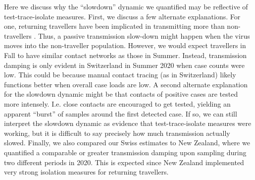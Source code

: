 \documentclass[9pt,twoside,lineno]{pnas-new} %
\begin{document}
Here we discuss why the ``slowdown'' dynamic we quantified may be reflective of test-trace-isolate measures. First, we discuss a few alternate explanations. For one, returning travellers have been implicated in transmitting more than non-travellers \cite{Hodcroft2021}. Thus, a passive transmission slow-down might happen when the virus moves into the non-traveller population. However, we would expect travellers in Fall to have similar contact networks as those in Summer. Instead, transmission damping is only evident in Switzerland in Summer 2020 when case counts were low. This could be because manual contact tracing (as in Switzerland) likely functions better when overall case loads are low. A second alternate explanation for the slowdown dynamic might be that contacts of positive cases are tested more intensely. I.e. close contacts are encouraged to get tested, yielding an apparent ``burst'' of samples around the first detected case. If so, we can still interpret the slowdown dynamic as evidence that test-trace-isolate measures were working, but it is difficult to say precisely how much transmission actually slowed. Finally, we also compared our Swiss estimates to New Zealand, where we quantified a comparable or greater transmission damping upon sampling during two different periods in 2020. This is expected since New Zealand implemented very strong isolation measures for returning travellers.

\end{document}
